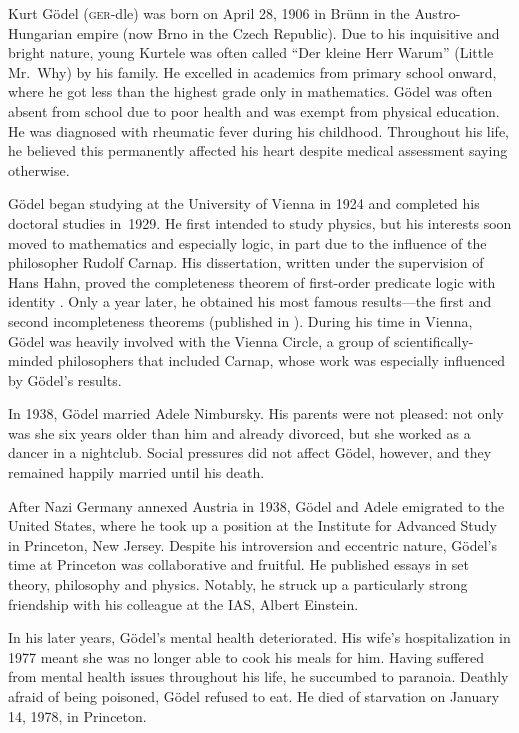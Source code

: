 \documentclass[../../../include/open-logic-section]{subfiles}
\begin{document}


Kurt G{\"o}del (\textsc{ger}-dle) was born on April 28, 1906 in
Br{\"u}nn in the Austro-Hungarian empire (now Brno in the Czech
Republic). Due to his inquisitive and bright nature, young Kurtele was
often called ``Der kleine Herr Warum'' (Little Mr.~Why) by his
family. He excelled in academics from primary school onward, where he
got less than the highest grade only in mathematics. G{\"o}del was
often absent from school due to poor health and was exempt from
physical education. He was diagnosed with rheumatic fever
during his childhood. Throughout his life, he believed this
permanently affected his heart despite medical assessment saying
otherwise.

G{\"o}del began studying at the University of Vienna in 1924 and
completed his doctoral studies in~1929. He first intended to study
physics, but his interests soon moved to mathematics and especially
logic, in part due to the influence of the philosopher Rudolf
Carnap. His dissertation, written under the supervision of Hans Hahn,
proved the completeness theorem of first-order predicate logic with
identity \cite{Godel1929}. Only a year later, he obtained his most
famous results---the first and second incompleteness theorems
(published in \cite{Godel1931}). During his time in Vienna,
G{\"o}del was heavily involved with the Vienna Circle, a group of
scientifically-minded philosophers that included Carnap, whose work
was especially influenced by G{\"o}del's results.

In 1938, G\"odel married Adele Nimbursky. His parents were not
pleased: not only was she six years older than him and already
divorced, but she worked as a dancer in a nightclub. 
Social pressures did not affect G{\"o}del, however,
and they remained happily married until his death.

After Nazi Germany annexed Austria in 1938, G{\"o}del and Adele
emigrated to the United States, where he took up a position at the
Institute for Advanced Study in Princeton, New Jersey. Despite his
introversion and eccentric nature, G{\"o}del's time at Princeton was
collaborative and fruitful.  He published essays in set theory,
philosophy and physics. Notably, he struck up a particularly strong
friendship with his colleague at the IAS, Albert Einstein.

In his later years, G{\"o}del's mental health deteriorated. His wife's
hospitalization in 1977 meant she was no longer able to cook his meals
for him. Having suffered from mental health issues throughout his
life, he succumbed to paranoia. Deathly afraid of being poisoned,
G{\"o}del refused to eat. He died of starvation on January 14, 1978, in
Princeton.
\end{document}
